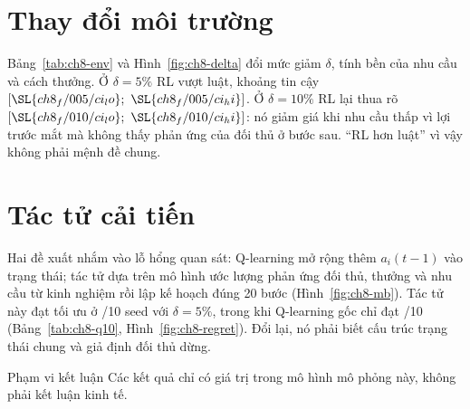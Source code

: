 \section{Thay đổi môi trường}\label{sec:ch8-env}

Bảng~\ref{tab:ch8-env} và Hình~\ref{fig:ch8-delta} đổi mức giảm $\delta$, tính bền của nhu cầu và cách thưởng. Ở $\delta=5\%$ RL vượt luật, khoảng tin cậy $[\SL{ch8_f/005/ci_lo};\ \SL{ch8_f/005/ci_hi}]$. Ở
$\delta=10\%$ RL lại thua rõ $[\SL{ch8_f/010/ci_lo};\ \SL{ch8_f/010/ci_hi}]$: nó giảm giá khi nhu cầu thấp vì lợi trước mắt mà không thấy phản ứng của đối thủ ở bước sau. ``RL hơn luật'' vì vậy không phải mệnh đề chung.


\section{Tác tử cải tiến}\label{sec:ch8-better}

Hai đề xuất nhắm vào lỗ hổng quan sát: Q-learning mở rộng thêm $a_i(t-1)$ vào trạng thái; tác tử dựa trên mô hình ước lượng phản ứng đối thủ, thưởng và nhu cầu từ kinh nghiệm rồi lập kế hoạch đúng 20 bước
(Hình~\ref{fig:ch8-mb}). Tác tử này đạt tối ưu ở /10 seed với $\delta=5\%$, trong khi Q-learning gốc chỉ đạt /10 (Bảng~\ref{tab:ch8-q10}, Hình~\ref{fig:ch8-regret}). Đổi lại, nó phải biết
cấu trúc trạng thái chung và giả định đối thủ dừng.



\FloatBarrier
\begin{luuy}{Phạm vi kết luận}
Các kết quả chỉ có giá trị trong mô hình mô phỏng này, không phải kết luận kinh tế.
\end{luuy}
